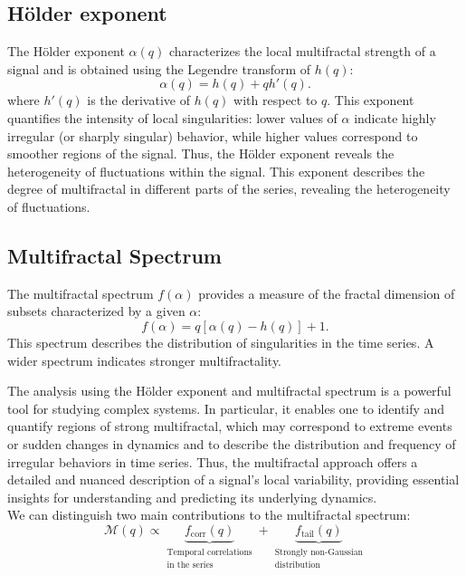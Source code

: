\documentclass[11pt]{extarticle}
\begin{document}
\subsection{Hölder exponent}
The Hölder exponent $\alpha(q)$ characterizes the local multifractal strength of a signal and is obtained using the Legendre transform of $h(q)$:
\begin{equation}
\alpha(q) = h(q) + q h'(q).
\end{equation}
where $h'(q)$ is the derivative of $h(q)$ with respect to $q$. This exponent quantifies the intensity of local
singularities: lower values of $\alpha$ indicate highly irregular (or sharply singular) behavior, while higher
values correspond to smoother regions of the signal. Thus, the Hölder exponent reveals the heterogeneity of fluctuations within the signal.
This exponent describes the degree of multifractal in different parts of the series, revealing the heterogeneity of fluctuations.

\subsection{Multifractal Spectrum}
The multifractal spectrum $f(\alpha)$ provides a measure of the fractal dimension of subsets characterized by a given $\alpha$:
\begin{equation}
f(\alpha) = q [\alpha(q) - h(q)] + 1.
\end{equation}
This spectrum describes the distribution of singularities in the time series. A wider spectrum indicates stronger multifractality.

The analysis using the Hölder exponent and multifractal spectrum is a powerful tool for studying complex systems.
In particular, it enables one to identify and quantify regions of strong multifractal, which may correspond to extreme
events or sudden changes in dynamics and to describe the distribution and frequency of irregular behaviors in time series.
Thus, the multifractal approach offers a detailed and nuanced description of a signal's local variability, providing
essential insights for understanding and predicting its underlying dynamics. \\

We can distinguish two main contributions to the multifractal spectrum:
\[
\mathcal{M}(q) \propto \underbrace{f_{\text{corr}}(q)}_{\substack{\text{Temporal correlations} \\ \text{in the series}}} + \underbrace{f_{\text{tail}}(q)}_{\substack{\text{Strongly non-Gaussian} \\ \text{distribution}}}
\]
\end{document}
